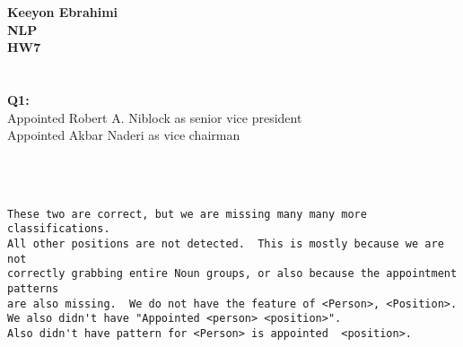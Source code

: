 \documentclass[ruled]{article}
\begin{document}
\textbf{Keeyon Ebrahimi}\\
\textbf{NLP}\\
\textbf{HW7}\\ \\ \\

\textbf{Q1:} \\
Appointed Robert A. Niblock  as senior  vice president\\ 
Appointed Akbar Naderi  as vice chairman\\ \\ \\

\begin{verbatim}

These two are correct, but we are missing many many more classifications.
All other positions are not detected.  This is mostly because we are not 
correctly grabbing entire Noun groups, or also because the appointment patterns 
are also missing.  We do not have the feature of <Person>, <Position>.  
We also didn't have "Appointed <person> <position>".  
Also didn't have pattern for <Person> is appointed  <position>.


\end{verbatim}
\end{document}
